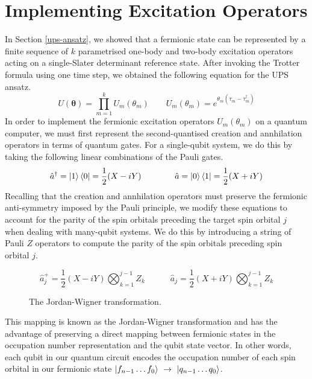 \section{Implementing Excitation Operators}

In Section \ref{ups-ansatz}, we showed that a fermionic state can be represented by a finite sequence of $k$ parametrised one-body and two-body excitation operators acting on a single-Slater determinant reference state. After invoking the Trotter formula using one time step, we obtained the following equation for the UPS ansatz.
\begin{equation*}
    U(\bm\theta) = \prod_{m=1}^k U_m(\theta_m) \qquad
    U_m(\theta_m) = e^{\theta_m (\tau_m - \tau_m^\dagger)}
\end{equation*}
In order to implement the fermionic excitation operators $U_m(\theta_m)$ on a quantum computer, we must first represent the second-quantised creation and annhilation operators in terms of quantum gates. For a single-qubit system, we do this by taking the following linear combinations of the Pauli gates.
\begin{equation*}
    \hat a^\dagger = \ket 1 \bra 0 = \frac{1}{2} (X - iY) \qquad\qquad
    \hat a = \ket 0 \bra 1 = \frac{1}{2} (X + iY) 
\end{equation*}
Recalling that the creation and annhilation operators must preserve the fermionic anti-symmetry imposed by the Pauli principle, we modify these equations to account for the parity of the spin orbitals preceding the target spin orbital $j$ when dealing with many-qubit systems. We do this by introducing a string of Pauli $Z$ operators to compute the parity of the spin orbitals preceding spin orbital $j$.

\begin{figure}[H]
    \centering
    \begin{equation*}
        \hat a_j^+ = \frac{1}{2} (X - iY) \bigotimes_{k=1}^{j-1} Z_k \qquad\quad
        \hat a_j = \frac{1}{2} (X + iY) \bigotimes_{k=1}^{j-1} Z_k
    \end{equation*}
    \caption{The Jordan-Wigner transformation.}
\end{figure}

This mapping is known as the Jordan-Wigner transformation \cite{Seeley2020} and has the advantage of preserving a direct mapping between fermionic states in the occupation number representation and the qubit state vector. In other words, each qubit in our quantum circuit encodes the occupation number of each spin orbital in our fermionic state $\ket{f_{n-1} \dots f_{0}} \,\,\rightarrow\,\, \ket{q_{n-1} \dots q_{0}}$.

